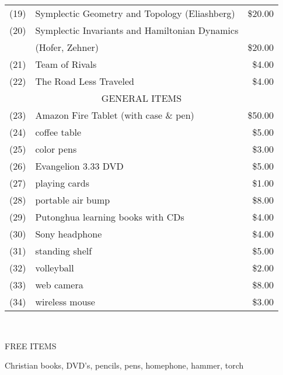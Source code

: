 \documentclass{article}[12pt]
\begin{document}
\begin{tabular}{rlr}
(19) & Symplectic Geometry and Topology (Eliashberg)  & \$20.00 \\[0.05in]
(20) & Symplectic Invariants and Hamiltonian Dynamics & \\
& (Hofer, Zehner) & \$20.00 \\[0.05in]
(21) & Team of Rivals & \$4.00 \\[0.05in]
(22) & The Road Less Traveled & \$4.00 \\[0.05in]
\multicolumn{3}{c}{GENERAL ITEMS} \\[0.05in]
(23) & Amazon Fire Tablet (with case \& pen) & \$50.00 \\[0.05in] 
(24) & coffee table & \$5.00 \\[0.05in]
(25) & color pens & \$3.00 \\[0.05in]
(26) & Evangelion 3.33 DVD & \$5.00 \\[0.05in]
(27) & playing cards &\$1.00 \\[0.05in]
(28) & portable air bump & \$8.00 \\[0.05in]
(29) & Putonghua learning books with CDs & \$4.00 \\[0.05in]
(30) & Sony headphone & \$4.00 \\[0.05in]
(31) & standing shelf & \$5.00 \\[0.05in]
(32) & volleyball & \$2.00 \\[0.05in]
(33) & web camera & \$8.00 \\[0.05in]
(34) & wireless mouse & \$3.00 
\end{tabular} \\
\begin{center} FREE ITEMS \end{center}
Christian books, DVD's, pencils, pens, homephone, hammer, torch


\end{document}
